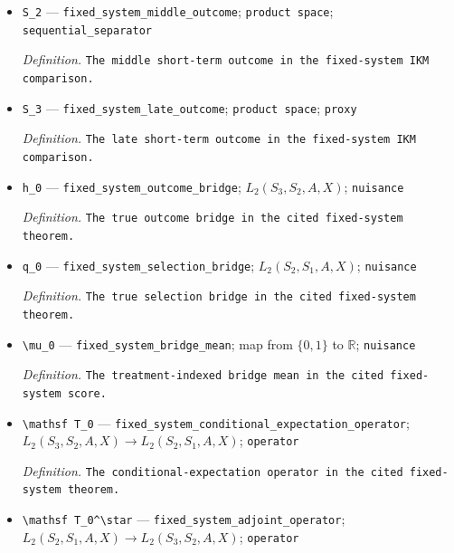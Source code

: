\documentclass{article}
\begin{document}
\begin{itemize}
  \item \texttt{S\_\allowbreak{}2} --- \texttt{fixed\_\allowbreak{}system\_\allowbreak{}middle\_\allowbreak{}outcome}; \texttt{product space}; \texttt{sequential\_\allowbreak{}separator}
  \par\smallskip\noindent\emph{Definition.} \texttt{The middle short-\allowbreak{}term outcome in the fixed-\allowbreak{}system IKM comparison.}
  \item \texttt{S\_\allowbreak{}3} --- \texttt{fixed\_\allowbreak{}system\_\allowbreak{}late\_\allowbreak{}outcome}; \texttt{product space}; \texttt{proxy}
  \par\smallskip\noindent\emph{Definition.} \texttt{The late short-\allowbreak{}term outcome in the fixed-\allowbreak{}system IKM comparison.}
  \item \texttt{h\_\allowbreak{}0} --- \texttt{fixed\_\allowbreak{}system\_\allowbreak{}outcome\_\allowbreak{}bridge}; \(L_2(S_3,S_2,A,X)\); \texttt{nuisance}
  \par\smallskip\noindent\emph{Definition.} \texttt{The true outcome bridge in the cited fixed-\allowbreak{}system theorem.}
  \item \texttt{q\_\allowbreak{}0} --- \texttt{fixed\_\allowbreak{}system\_\allowbreak{}selection\_\allowbreak{}bridge}; \(L_2(S_2,S_1,A,X)\); \texttt{nuisance}
  \par\smallskip\noindent\emph{Definition.} \texttt{The true selection bridge in the cited fixed-\allowbreak{}system theorem.}
  \item \texttt{\textbackslash{}\allowbreak{}mu\_\allowbreak{}0} --- \texttt{fixed\_\allowbreak{}system\_\allowbreak{}bridge\_\allowbreak{}mean}; map from \(\{0,1\}\) to \(\mathbb R\); \texttt{nuisance}
  \par\smallskip\noindent\emph{Definition.} \texttt{The treatment-\allowbreak{}indexed bridge mean in the cited fixed-\allowbreak{}system score.}
  \item \texttt{\textbackslash{}\allowbreak{}mathsf T\_\allowbreak{}0} --- \texttt{fixed\_\allowbreak{}system\_\allowbreak{}conditional\_\allowbreak{}expectation\_\allowbreak{}operator}; \(L_2(S_3,S_2,A,X)\to L_2(S_2,S_1,A,X)\); \texttt{operator}
  \par\smallskip\noindent\emph{Definition.} \texttt{The conditional-\allowbreak{}expectation operator in the cited fixed-\allowbreak{}system theorem.}
  \item \texttt{\textbackslash{}\allowbreak{}mathsf T\_\allowbreak{}0\textasciicircum{}\textbackslash{}\allowbreak{}star} --- \texttt{fixed\_\allowbreak{}system\_\allowbreak{}adjoint\_\allowbreak{}operator}; \(L_2(S_2,S_1,A,X)\to L_2(S_3,S_2,A,X)\); \texttt{operator}

\end{itemize}
\end{document}
